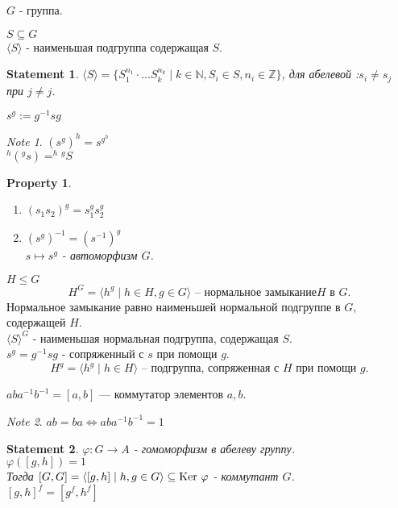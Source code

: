 \documentclass[11pt]{book}
\newcommand{\Z}{\mathbb{Z}}
\newcommand{\N}{\mathbb{N}}
\newcommand{\ke}{{\mathop{\text{\rm Ker}}}~}
\theoremstyle{definition}
\theoremstyle{plain}
\theoremstyle{plain}
\newtheorem*{st}{Statement}
\newtheorem*{prop}{Property}
\theoremstyle{definition}
\theoremstyle{remark}
\newtheorem*{note}{Note}
\begin{document}
$G$ - группа.
\begin{defn}
    $S \subseteq G$ \\
    $\langle S \rangle$ - наименьшая подгруппа содержащая $S$. 
\end{defn}
\begin{st}
    $\langle S \rangle = \{S_1 ^{n_1}\cdot \ldots  S_k^{n_k}\mid k \in  \N , S_i \in  S, n_i \in  \Z\}$, для абелевой :$s_i \ne s_j$ при $j \ne j$.
\end{st}
\begin{defn}
    $s ^g := g^{-1} s g$
\end{defn}
\begin{note}
    $(s^g)^h = s^{g^h}$\\
    $^h\!(^g\!s) = ^h\!^g\!S$
\end{note}
\begin{prop}$ $
    \begin{enumerate}
	\item $(s_1 s_2)^g = s_1 ^g s_2 ^g$ 
	\item $(s^g)^{-1} = (s^{-1})^g$\\
	    $s \mapsto s^g$ - автоморфизм $G $.
    \end{enumerate}
\end{prop}
\begin{defn}
    $H \le G$ 
    \[
	H^G = \langle h^g \mid h \in  H, g \in  G \rangle  \mbox{ -- нормальное замыкание} H \mbox{ в } G
    .\]  
    Нормальное замыкание равно наименьшей нормальной подгруппе в $G$, содержащей $H$.\\
    $\langle S \rangle ^G$ - наименьшая нормальная подгруппа, содержащая $S$.\\
    $s^g= g^{-1} s g$  - сопряженный с $s$ при помощи $g$.\\
    \[
	H^g=\langle h^g \mid h \in  H\rangle \mbox{ -- подгруппа, сопряженная с $H$ при помощи $g$}
    .\] 
\end{defn}
\begin{defn}
    $aba^{-1}b^{-1} = [a, b] $ --- коммутатор элементов $a, b$.
\end{defn}
\begin{note}
    $ab = ba \Leftrightarrow aba^{-1}b^{-1} = 1$\\
\end{note}
\begin{st}
    $\varphi  : G \to A$ - гомоморфизм в абелеву группу.\\
    $\varphi([g, h]) = 1$ \\
    Тогда $[G, G] = \langle [g, h]\mid h, g \in  G \rangle \subseteq \ke \varphi $ - коммутант $G$. \\
    $[g, h] ^f = [g^f , h^f]$
\end{st}
\end{document}
